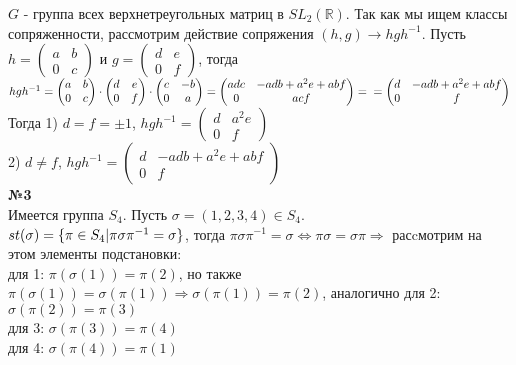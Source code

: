 \documentclass[a4paper, 12pt]{article}
\begin{document}
	$G$ - группа всех верхнетреугольных матриц в $SL_2(\mathbb R)$. Так как мы ищем классы сопряженности, рассмотрим действие сопряжения $(h, g) \rightarrow hgh^{-1}$. Пусть
	$h = \begin{pmatrix}
		a & b \\
		0 & c  
	\end{pmatrix}$ и
	$g = \begin{pmatrix}
	d & e \\
	0 & f  
	\end{pmatrix}$, тогда \\ $hgh^{-1} =
	\begin{pmatrix}
	a & b \\
	0 & c  
	\end{pmatrix} \cdot 
	\begin{pmatrix}
	d & e \\
	0 & f  
	\end{pmatrix} \cdot
	\begin{pmatrix}
	c & -b \\
	0 & a  
	\end{pmatrix} =
	\begin{pmatrix}
	adc & -adb + a^2e + abf \\
	0 & acf 
	\end{pmatrix} = \\ =
	\begin{pmatrix}
	d & -adb + a^2e + abf \\
	0 & f
	\end{pmatrix}$ \\
	Тогда 1) $d = f = \pm1$, $hgh^{-1} =
	\begin{pmatrix}
		d & a^2e \\
		0 & f
	\end{pmatrix}$ \\
	2) $d \neq f$, $hgh^{-1} =
	\begin{pmatrix}
	d & -adb + a^2e + abf \\
	0 & f
	\end{pmatrix}$ \\
	
	\textbf{№3} \\
	
	Имеется группа $S_4$. Пусть $\sigma = (1, 2, 3, 4) \in S_4$. \\
	$st(\sigma) = \{\pi \in S_4 \arrowvert \pi\sigma \pi^{-1} = \sigma\}$, тогда $\pi\sigma \pi^{-1} = \sigma  \Leftrightarrow \pi\sigma = \sigma \pi \Rightarrow$ расcмотрим на этом элементы подстановки: \\
	для 1: $\pi(\sigma(1)) = \pi(2)$, но также $\pi(\sigma(1)) = \sigma(\pi(1)) \Rightarrow \sigma(\pi(1)) = \pi(2)$, аналогично для 2: $\sigma(\pi(2)) = \pi(3)$ \\
	для 3: $\sigma(\pi(3)) = \pi(4)$ \\
	для 4: $\sigma(\pi(4)) = \pi(1)$
	
\end{document}
